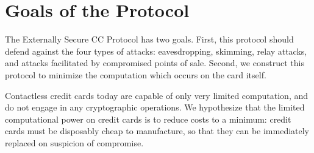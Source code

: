 \section{Goals of the Protocol}
\label{sec:external-goals}

The Externally Secure CC Protocol has two goals.
First, this protocol should defend against the four types of attacks:
    eavesdropping, skimming, relay attacks, and attacks facilitated by compromised points of sale.
Second, we construct this protocol to minimize the computation which occurs on the card itself.

Contactless credit cards today are capable of only very limited computation, and do not engage in any cryptographic operations.
We hypothesize that the limited computational power on credit cards is to reduce costs to a minimum:
	credit cards must be disposably cheap to manufacture, so that they can be immediately replaced on suspicion of compromise.
